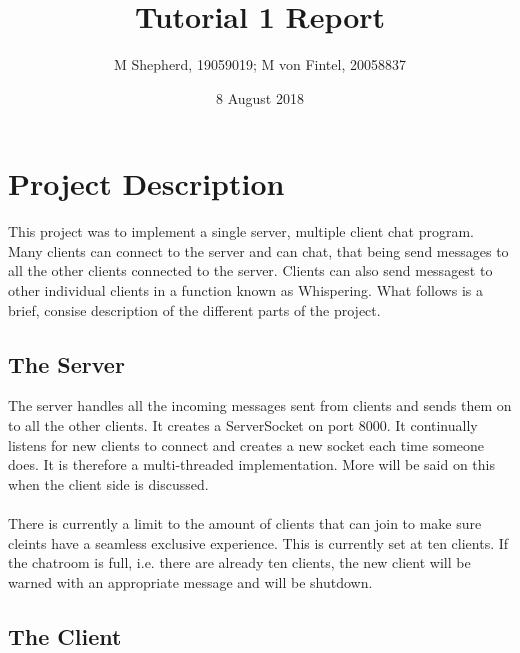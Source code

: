 \documentclass[11pt]{article}
\begin{document}
\title{Tutorial 1 Report}
\author{M Shepherd, 19059019; M von Fintel, 20058837}
\date{8 August 2018}

\maketitle

\section{Project Description}

This project was to implement a single server, multiple client chat program.
Many clients can connect to the server and can chat, that being send messages to
all the other clients connected to the server. Clients can also send messagest to
other individual clients in a function known as Whispering. What follows is a brief,
consise description of the different parts of the project.

\subsection{The Server}

The server handles all the incoming messages sent from clients and sends them on
to all the other clients. It creates a ServerSocket on port 8000. It continually
listens for new clients to connect and creates a new socket each time someone
does. It is therefore a multi-threaded implementation. More will be said on this
when the client side is discussed.
\\\\
There is currently a limit to the amount of clients that
can join to make sure cleints have a seamless exclusive experience. This is currently set
at ten clients. If the chatroom is full, i.e. there are already ten clients, the new client
will be warned with an appropriate message and will be shutdown.

\subsection{The Client}
\end{document}
